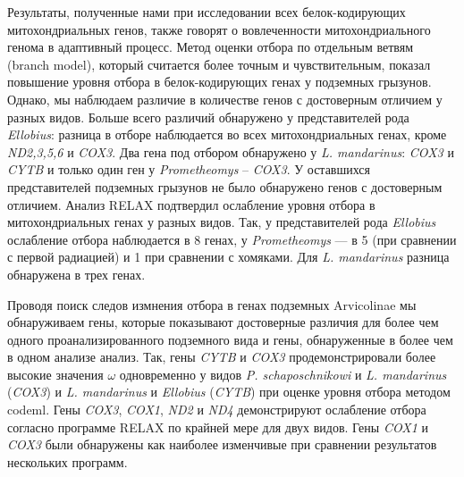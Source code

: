 Результаты, полученные нами при исследовании всех белок-кодирующих митохондриальных генов, также говорят о вовлеченности митохондриального генома в адаптивный процесс. Метод оценки отбора по отдельным ветвям (branch model), который считается более точным и чувствительным, показал повышение уровня отбора в белок-кодирующих генах у подземных грызунов. Однако, мы наблюдаем различие в количестве генов с достоверным отличием у разных видов. Больше всего различий обнаружено у представителей рода \textit{Ellobius}: разница в отборе наблюдается во всех митохондриальных генах, кроме \textit{ND2,3,5,6} и \textit{COX3}. Два гена под отбором обнаружено у \textit{L. mandarinus}: \textit{COX3} и \textit{CYTB} и только один ген у \textit{Prometheomys} -- \textit{COX3}. У оставшихся представителей подземных грызунов не было обнаружено генов с достоверным отличием. Анализ RELAX подтвердил ослабление уровня отбора в митохондриальных генах у разных видов. Так, у представителей рода \textit{Ellobius} ослабление отбора наблюдается в 8 генах, у \textit{Prometheomys} --- в 5 (при сравнении с первой радиацией) и 1 при сравнении с хомяками. Для \textit{L. mandarinus} разница обнаружена в трех генах.  

Проводя поиск следов измнения отбора в генах подземных Arvicolinae мы обнаруживаем гены, которые показывают достоверные различия для более чем одного проанализированного подземного вида и гены, обнаруженные в более чем в одном анализе анализ. Так, гены \textit{CYTB} и \textit{COX3} продемонстрировали более высокие значения $\omega$ одновременно у видов \textit{P. schaposchnikowi} и \textit{L. mandarinus} (\textit{COX3}) и \textit{L. mandarinus} и \textit{Ellobius} (\textit{CYTB}) при оценке уровня отбора методом codeml. Гены \textit{COX3}, \textit{COX1}, \textit{ND2} и \textit{ND4} демонстрируют ослабление отбора согласно программе RELAX по крайней мере для двух видов. Гены \textit{COX1} и \textit{COX3} были обнаружены как наиболее изменчивые при сравнении результатов нескольких программ. 


